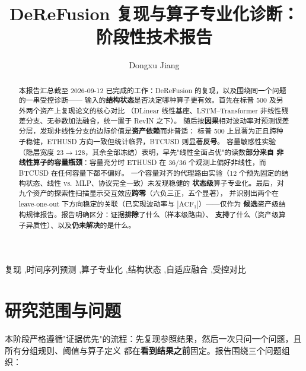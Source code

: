 \documentclass[preprint,12pt]{elsarticle}
\begin{document}
\begin{frontmatter}

\title{DeReFusion 复现与算子专业化诊断：阶段性技术报告}

\author[nwpu]{Dongxu Jiang}

\begin{abstract}
本报告汇总截至 2026-09-12 已完成的工作：DeReFusion 的复现，以及围绕同一个问题的一串受控诊断——
输入的\textbf{结构状态}是否决定哪种算子更有效。首先在标普 500 及另外两个资产上复现论文的核心对比
（DLinear 线性基座、LSTM--Transformer 非线性残差分支、无参数加法融合，统一置于 RevIN 之下）。
随后按\textbf{因果}相对波动率对预测误差分层，发现非线性分支的边际价值是\textbf{资产依赖}而非普适：
标普 500 上显著为正且跨种子稳健，ETHUSD 方向一致但统计临界，BTCUSD 则显著\textbf{反号}。
容量敏感性实验（隐层宽度 $23\!\to\!128$，其余全部冻结）表明，早先"线性全面占优"的读数\textbf{部分来自
非线性算子的容量瓶颈}：容量充分时 ETHUSD 在 $36/36$ 个观测上偏好非线性，而 BTCUSD 在任何容量下都不偏好。
一个容量对齐的代理路由实验（12 个预先固定的结构状态、线性 vs.\ MLP、协议完全一致）未发现稳健的
\textbf{状态级}算子专业化。最后，对九个资产的探索性扫描显示交互效应\textbf{跨零}（六负三正，五个显著），
并识别出两个在 leave-one-out 下方向稳定的关联（已实现波动率与 $|\mathrm{ACF}_1|$）——仅作为
\textbf{候选}资产级结构规律报告。报告明确区分：证据\textbf{排除}了什么（样本级路由）、
\textbf{支持}了什么（资产级算子异质性）、以及\textbf{仍未解决}的是什么。
\end{abstract}

\begin{keyword}
复现 \sep 时间序列预测 \sep 算子专业化 \sep 结构状态 \sep 自适应融合 \sep 受控对比
\end{keyword}

\end{frontmatter}

\section{研究范围与问题}
\label{sec:intro}

本阶段严格遵循"证据优先"的流程：先复现参照结果，然后一次只问一个问题，且所有分组规则、阈值与算子定义
都在\textbf{看到结果之前}固定。报告围绕三个问题组织：
\end{document}
